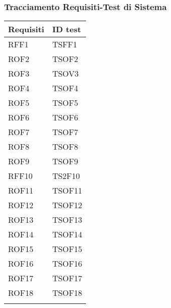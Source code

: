 \documentclass[../PianoDiQualifica_v3.0.0.tex]{subfiles}
\begin{document}
	\subsubsection{Tracciamento Requisiti-Test di Sistema}
	\begin{longtable}[c] { >{\centering\arraybackslash}p{3cm} >{\centering\arraybackslash}p{3cm}}
		\toprule
		\centerline{\textbf{Requisiti}} & \centerline{\textbf{ID test}} \\
			\midrule
			RFF1 & TSFF1 \\
			\addlinespace[0.3em]
			\midrule
			\addlinespace[0.3em]
			ROF2 & TSOF2 \\
			\addlinespace[0.3em]
			\midrule
			\addlinespace[0.3em]
			ROF3 & TSOV3 \\
			\addlinespace[0.3em]
			\midrule
			\addlinespace[0.3em]
			ROF4 & TSOF4 \\
			\addlinespace[0.3em]
			\midrule
			\addlinespace[0.3em]
			ROF5 & TSOF5 \\
			\addlinespace[0.3em]
			\midrule
			\addlinespace[0.3em]
			ROF6 & TSOF6 \\
			\addlinespace[0.3em]
			\midrule
			\addlinespace[0.3em]
			ROF7 & TSOF7 \\
			\addlinespace[0.3em]
			\midrule
			\addlinespace[0.3em]
			ROF8 & TSOF8 \\
			\addlinespace[0.3em]
			\midrule
			\addlinespace[0.3em]
			ROF9 & TSOF9 \\
			\addlinespace[0.3em]
			\midrule
			\addlinespace[0.3em]
			RFF10 & TS2F10 \\
			\addlinespace[0.3em]
			\midrule
			\addlinespace[0.3em]
			ROF11 & TSOF11 \\
			\addlinespace[0.3em]
			\midrule
			\addlinespace[0.3em]
			ROF12 & TSOF12 \\
			\addlinespace[0.3em]
			\midrule
			\addlinespace[0.3em]
			ROF13 & TSOF13 \\
			\addlinespace[0.3em]
			\midrule
			\addlinespace[0.3em]
			ROF14 & TSOF14 \\
			\addlinespace[0.3em]
			\midrule
			\addlinespace[0.3em]
			ROF15 & TSOF15 \\
			\addlinespace[0.3em]
			\midrule
			\addlinespace[0.3em]
			ROF16 & TSOF16 \\
			\addlinespace[0.3em]
			\midrule
			\addlinespace[0.3em]
			ROF17 & TSOF17 \\
			\addlinespace[0.3em]
			\midrule
			\addlinespace[0.3em]
			ROF18 & TSOF18 \\
			\addlinespace[0.3em]

\end{longtable}
\end{document}
